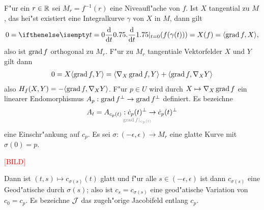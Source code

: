 F"ur ein $r \in \operatorname{\mathbb{R}}$ sei $M_r = f^{-1}(r)$ eine Niveaufl"ache von $f$.
Ist $X$ tangential zu $M$, das hei"st existiert eine Integralkurve $\gamma$ von $X$ in $M$, dann gilt
\begin{align*}
	0 = \difffrac[t=0]{}{t} (f(\gamma(t))) = X(f) = \langle \grad f, X \rangle,
\end{align*}
also ist $\operatorname{grad} f$ orthogonal zu $M_r$. F"ur zu $M_r$ tangentiale Vektorfelder $X$ und $Y$ gilt dann
\begin{align*}
	0 = X \langle \operatorname{grad} f, Y \rangle = \langle \nabla_X \operatorname{grad} f, Y \rangle + \langle \operatorname{grad} f, \nabla_X Y \rangle
\end{align*}
also $H_f(X,Y) = - \langle \operatorname{grad} f, \nabla_X Y \rangle$. F"ur $p \in U$ wird durch $X \mapsto \nabla_X \operatorname{grad} f$ ein linearer Endomorphismus $A_p: \operatorname{grad} f^\perp \to \operatorname{grad} f^\perp$ definiert.
Es bezeichne
\begin{align*}
	A_t = A_{c_p(t)}: \underset{\mathclap{\textcolor{gray}{\grad f|_{c_p(t)}}}}{\dot{c}_p(t)^\perp} \to \dot c_p(t)^\perp
\end{align*}
eine Einschr"ankung auf $c_p$. Es sei $\sigma: (-\epsilon, \epsilon) \to M_r$ eine glatte Kurve mit $\sigma(0) = p$.
\begin{center}\textcolor{red}{[BILD]}\end{center}
Dann ist $(t, s) \mapsto c_{\sigma(s)}(t)$ glatt und f"ur alle $s \in (-\epsilon, \epsilon)$ ist dann $c_{\sigma(s)}$ eine Geod"atische durch $\sigma(s)$; also ist $c_s = c_{\sigma(s)}$ eine geod"atische Variation von $c_0 = c_p$.
Es bezeichne $\operatorname{\mathcal{J}}$ das zugeh"orige Jacobifeld entlang $c_p$.
